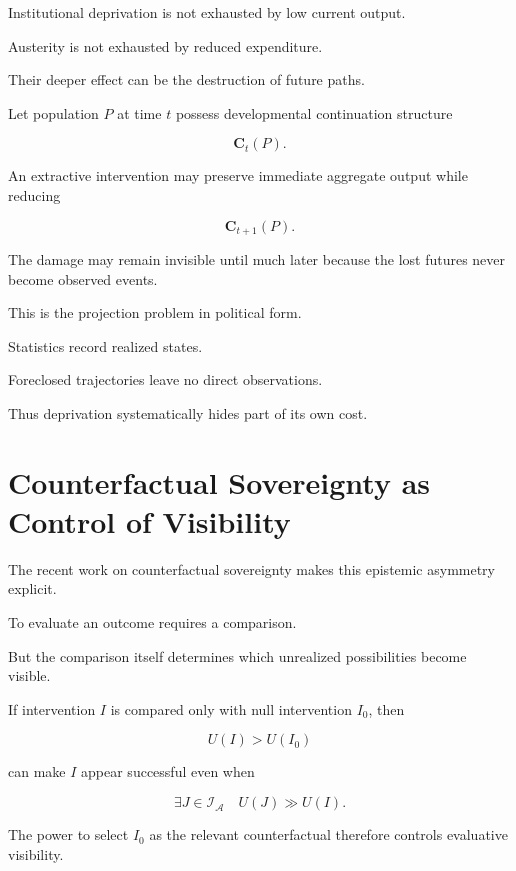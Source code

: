 \documentclass[11pt]{article}
\theoremstyle{remark}
\newcommand{\Adm}{\mathcal{A}}
\begin{document}
Institutional deprivation is not exhausted by low current output.

Austerity is not exhausted by reduced expenditure.

Their deeper effect can be the destruction of future paths.

Let population $P$ at time $t$ possess developmental continuation structure

\begin{equation}
\mathbf{C}_t(P).
\end{equation}

An extractive intervention may preserve immediate aggregate output while reducing

\begin{equation}
\mathbf{C}_{t+1}(P).
\end{equation}

The damage may remain invisible until much later because the lost futures never become observed events.

This is the projection problem in political form.

Statistics record realized states.

Foreclosed trajectories leave no direct observations.

Thus deprivation systematically hides part of its own cost.

\section{Counterfactual Sovereignty as Control of Visibility}

The recent work on counterfactual sovereignty makes this epistemic asymmetry explicit.

To evaluate an outcome requires a comparison.

But the comparison itself determines which unrealized possibilities become visible.

If intervention $I$ is compared only with null intervention $I_0$, then

\begin{equation}
U(I)>U(I_0)
\end{equation}

can make $I$ appear successful even when

\begin{equation}
\exists J\in\mathcal{I}_{\Adm}
\quad
U(J)\gg U(I).
\end{equation}

The power to select $I_0$ as the relevant counterfactual therefore controls evaluative visibility.
\end{document}
